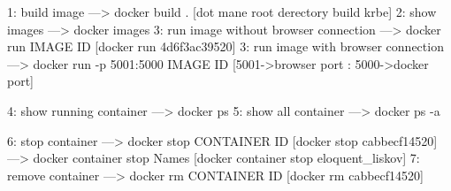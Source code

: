 1: build image ---> docker build . [dot mane root derectory build krbe]
2: show images ---> docker images
3: run image without browser connection ---> docker run IMAGE ID [docker run 4d6f3ac39520]
3: run image with browser connection ---> docker run -p 5001:5000 IMAGE ID [5001->browser port : 5000->docker port]

4: show running container ---> docker ps
5: show all container ---> docker ps -a

6: stop container ---> docker stop CONTAINER ID [docker stop cabbecf14520]
                  ---> docker container stop Names [docker container stop eloquent_liskov]
7: remove container ---> docker rm CONTAINER ID [docker rm cabbecf14520]
